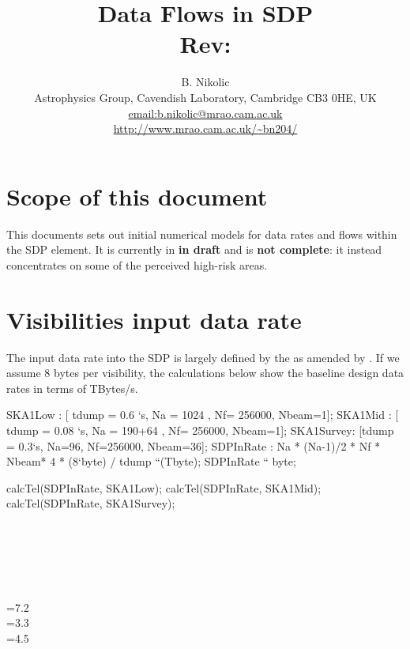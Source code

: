 \documentclass[useAMS,usenatbib,referee]{article}
\title{Data Flows in SDP\\
  Rev: }
\author{B. Nikolic\\
  Astrophysics Group, Cavendish Laboratory, Cambridge CB3 0HE, UK
  \\\url{email:b.nikolic@mrao.cam.ac.uk}
 \\\url{http://www.mrao.cam.ac.uk/~bn204/}}
\begin{document}
\maketitle

\tableofcontents

\section{Scope of this document}

This documents sets out initial numerical models for data rates and
flows within the SDP element. It is currently in {\bf in draft} and is
{\bf not complete}: it instead concentrates on some of the perceived
high-risk areas. 

\section{Visibilities input data rate}

The input data rate into the SDP is largely defined by the
\cite{DewdneyDD001-1} as amended by \cite{McCoolDD003}.  If we assume
8 bytes per visibility, the calculations below show the baseline
design data rates in terms of TBytes/s. 

\begin{maxima}
SKA1Low : [ tdump = 0.6 `s, Na = 1024 , Nf= 256000, Nbeam=1];
SKA1Mid : [ tdump = 0.08 `s, Na = 190+64 , Nf= 256000, Nbeam=1];
SKA1Survey: [tdump = 0.3`s, Na=96, Nf=256000, Nbeam=36];
SDPInRate : Na * (Na-1)/2 * Nf * Nbeam* 4 * (8`byte) / tdump  ``(Tbyte);
SDPInRate `` byte;

calcTel(SDPInRate, SKA1Low);
calcTel(SDPInRate, SKA1Mid);
calcTel(SDPInRate, SKA1Survey);

\maximaoutput*
\m  \left[ t_{\rm dump}=0.6\;\mathrm{s} , N_{\rm a}=1024 , N_{\rm f}=256000 , N_{\rm beam}=1 \right] \\
\m  \left[ t_{\rm dump}=0.08\;\mathrm{s} , N_{\rm a}=254 , N_{\rm f}=256000 , N_{\rm beam}=1 \right] \\
\m  \left[ t_{\rm dump}=0.3\;\mathrm{s} , N_{\rm a}=96 , N_{\rm f}=256000 , N_{\rm beam}=36 \right] \\
\; \\
\; \\
\m  {}=7.2 \\
\m  {}=3.3 \\
\m  {}=4.5 \\
\end{maxima}
\end{document}
